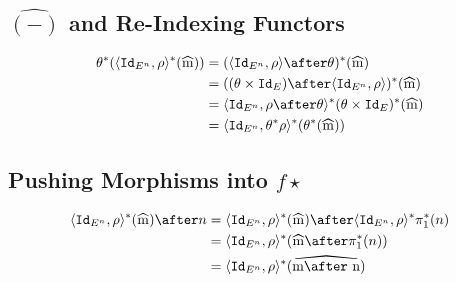    \subsection{$\hat{(-)}$ and Re-Indexing Functors}
    \begin{align*}
        \theta\star(\pr{\Id{E^n}}{\rho}\star(\widehat{m})) &= (\pr{\Id{E^n}}{\rho}\after\theta)\star(\widehat{m})\\
        & = ((\theta\times\Id{E})\after\pr{\Id{E^n}}{\rho})\star(\widehat{m})\\
        & = \pr{\Id{E^n}}{\rho\after\theta}\star(\theta\times\Id{E})\star(\widehat{m}) \\
        & = \pr{\Id{E^n}}{\theta\star\rho}\star(\theta\star(\widehat{m}))
    \end{align*}

\subsection{Pushing Morphisms into $f\star$}

\begin{align*}
    \pr{\Id{E^n}}{\rho}\star(\widehat{m})\after n &= \pr{\Id{E^n}}{\rho}\star(\widehat{m})\after\pr{\Id{E^n}}{\rho}\star\p\star(n)\\
    & = \pr{\Id{E^n}}{\rho}\star(\widehat{m}\after\pstar(n))\\
    &= \pr{\Id{E^n}}{\rho}\star(\widehat{m\after n})
\end{align*}